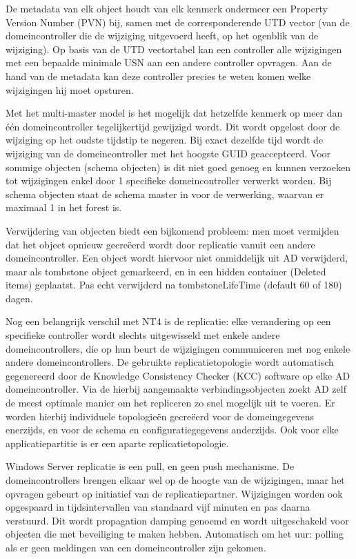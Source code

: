 De metadata van elk object houdt van elk kenmerk ondermeer een Property Version
Number (PVN) bij, samen met de corresponderende UTD vector (van de
domeincontroller die de wijziging uitgevoerd heeft, op het ogenblik van de
wijziging). Op basis van de UTD vectortabel kan een controller alle wijzigingen
met een bepaalde minimale USN aan een andere controller opvragen. Aan de hand
van de metadata kan deze controller precies te weten komen welke wijzigingen hij
moet opsturen.

Met het multi-master model is het mogelijk dat hetzelfde kenmerk op meer dan één
domeincontroller tegelijkertijd gewijzigd wordt. Dit wordt opgelost door de
wijziging op het oudste tijdstip te negeren. Bij exact dezelfde tijd wordt de
wijziging van de domeincontroller met het hoogste GUID geaccepteerd. Voor
sommige objecten (schema objecten) is dit niet goed genoeg en kunnen verzoeken
tot wijzigingen enkel door 1 specifieke domeincontroller verwerkt worden. Bij 
schema objecten staat de schema master in voor de verwerking, waarvan er 
maximaal 1 in het forest is.

Verwijdering van objecten biedt een bijkomend probleem: men moet vermijden dat
het object opnieuw gecreëerd wordt door replicatie vanuit een andere
domeincontroller. Een object wordt hiervoor niet onmiddelijk uit AD verwijderd,
maar als tombstone object gemarkeerd, en in een hidden container (Deleted items)
geplaatst. Pas echt verwijderd na tombstoneLifeTime (default 60 of 180) dagen.

Nog een belangrijk verschil met NT4 is de  replicatie:
elke verandering op een specifieke controller wordt slechts uitgewisseld met
enkele andere domeincontrollers, die op hun beurt de wijzigingen communiceren
met nog enkele andere domeincontrollers. De gebruikte replicatietopologie wordt
automatisch gegenereerd door de Knowledge Consistency Checker (KCC) software op
elke AD domeincontroller. Via de hierbij aangemaakte verbindingsobjecten zoekt
AD zelf de meest optimale manier om het repliceren zo snel mogelijk uit te
voeren. Er worden hierbij individuele topologieën gecreëerd voor de
domeingegevens enerzijds, en voor de schema en configuratiegegevens anderzijds.
Ook voor elke applicatiepartitie is er een aparte replicatietopologie.

Windows Server replicatie is een pull, en geen push mechanisme. De
domeincontrollers brengen elkaar wel op de hoogte van de wijzigingen, maar het
opvragen gebeurt op initiatief van de replicatiepartner. Wijzigingen worden ook
opgespaard in tijdsintervallen van standaard vijf minuten en pas daarna
verstuurd. Dit wordt propagation damping genoemd en wordt uitgeschakeld voor
objecten die met beveiliging te maken hebben. Automatisch om het uur: polling als
er geen meldingen van een domeincontroller zijn gekomen.

